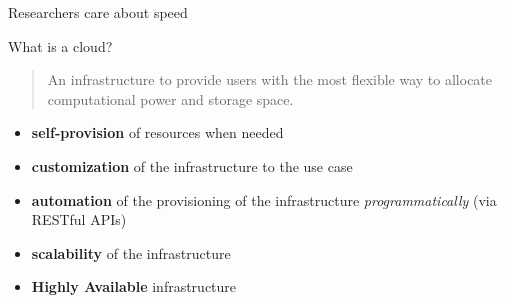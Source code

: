 \documentclass[english,serif,mathserif,usenames,dvipsnames]{beamer}
\begin{document}
\begin{frame}
  {Researchers care about speed}


\end{frame}


\begin{frame}
  {What is a cloud?}

  \begin{quotation}
    An infrastructure to provide users with the most flexible way to
    allocate computational power and storage space.
  \end{quotation}
  \+

  \begin{itemize}
  \item \textbf{self-provision} of resources when needed
  \item \textbf{customization} of the infrastructure to the use case
  \item \textbf{automation} of the provisioning of the infrastructure
    \emph{programmatically} (via RESTful APIs)
  \item \textbf{scalability} of the infrastructure
  \item \textbf{Highly Available} infrastructure
  \end{itemize}
  
\end{frame}
\end{document}
